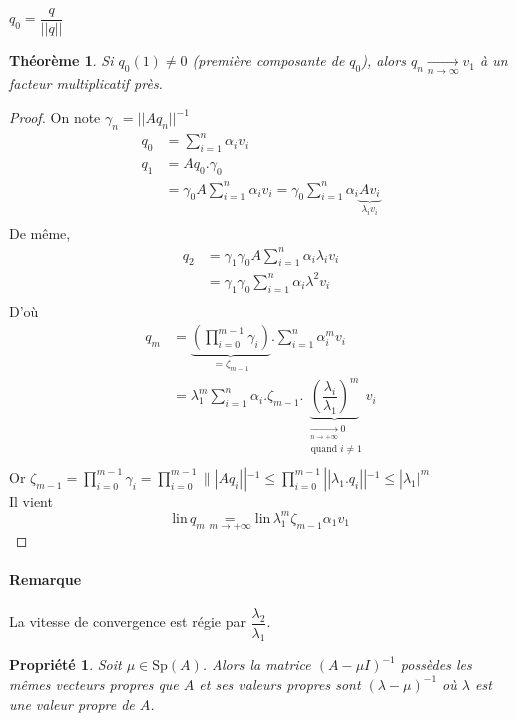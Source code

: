 \documentclass{article}
\newtheorem{thm}{Théorème}
\newtheorem{prop}{Propriété}
\newcommand{\lin}{\text{lin}\,}
\begin{document}
\begin{algorithm}[H]
$q_0 = \dfrac{q}{||q||}$\;
\end{algorithm}

\begin{thm}
Si $q_0(1)\neq 0$ (première composante de $q_0$), alors $q_n \underset{n\to \infty}{\to} v_1$ à un facteur multiplicatif près.
\end{thm}

\begin{proof}
On note $\gamma_n = ||Aq_n||^{-1}$
\begin{align*}
q_0 &= \sum_{i=1}^n \alpha_i v_i\\
q_1 & = Aq_0.\gamma_0\\
& = \gamma_0 A \sum_{i=1}^n \alpha_i v_i = \gamma_0 \sum_{i=1}^n \alpha_i \underbrace{Av_i}_{\lambda_i v_i}\\
\end{align*}
De même,
\begin{align*}
q_2 & = \gamma_1 \gamma_0 A \sum_{i=1}^n \alpha_i \lambda_i v_i\\
& = \gamma_1 \gamma_0 \sum_{i=1}^n \alpha_i \lambda^2 v_i\\
\end{align*}
D'où
\begin{align*}
q_m &=\underbrace{\left( \prod_{i=0}^ {m-1} \gamma_i \right)}_{= \zeta_{m-1}} . \sum_{i=1}^{n}\alpha_i^m v_i\\
& = \lambda_1^m  \sum_{i=1}^n \alpha_i .  \zeta_{m-1} . \underbrace{\left( \dfrac{\lambda_i}{\lambda_1} \right)^m}_{\substack{\underset{n\to +\infty}{\longrightarrow} 0\\ \text{ quand $i \neq 1$}}} v_i\\
\end{align*}
Or $\zeta_{m-1} = \prod_{i=0}^{m-1} \gamma_i = \prod_{i=0}^{m-1} \||Aq_{i}||^{-1} \leq \prod_{i=0}^{m-1} ||\lambda_1.q_i||^{-1}\leq |\lambda_1|^m$\\
Il vient
\[
\lin q_m \underset{m\to + \infty}{=} \lin \lambda_1^m \zeta_{m-1}\alpha_1 v_1  \]
\end{proof}

\paragraph{Remarque}
La vitesse de convergence est régie par $\dfrac{\lambda_2}{\lambda_1}$.

\begin{prop}
Soit $\mu\in \text{Sp}(A)$. Alors la matrice $(A-\mu I)^{-1}$ possèdes les mêmes vecteurs propres que $A$ et ses valeurs propres sont  $(\lambda - \mu)^{-1}$ où $\lambda$ est une valeur propre de $A$.
\end{prop}
\end{document}
